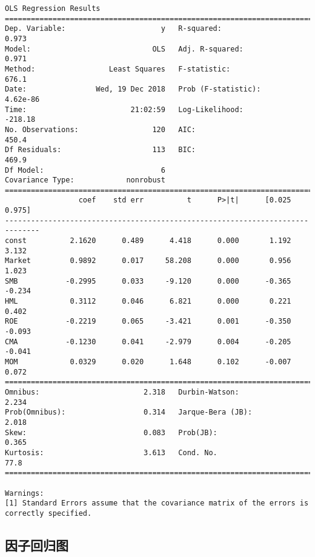 \documentclass[11pt]{article}
\begin{document}
    \begin{Verbatim}[commandchars=\\\{\}]
                            OLS Regression Results                            
==============================================================================
Dep. Variable:                      y   R-squared:                       0.973
Model:                            OLS   Adj. R-squared:                  0.971
Method:                 Least Squares   F-statistic:                     676.1
Date:                Wed, 19 Dec 2018   Prob (F-statistic):           4.62e-86
Time:                        21:02:59   Log-Likelihood:                -218.18
No. Observations:                 120   AIC:                             450.4
Df Residuals:                     113   BIC:                             469.9
Df Model:                           6                                         
Covariance Type:            nonrobust                                         
==============================================================================
                 coef    std err          t      P>|t|      [0.025      0.975]
------------------------------------------------------------------------------
const          2.1620      0.489      4.418      0.000       1.192       3.132
Market         0.9892      0.017     58.208      0.000       0.956       1.023
SMB           -0.2995      0.033     -9.120      0.000      -0.365      -0.234
HML            0.3112      0.046      6.821      0.000       0.221       0.402
ROE           -0.2219      0.065     -3.421      0.001      -0.350      -0.093
CMA           -0.1230      0.041     -2.979      0.004      -0.205      -0.041
MOM            0.0329      0.020      1.648      0.102      -0.007       0.072
==============================================================================
Omnibus:                        2.318   Durbin-Watson:                   2.234
Prob(Omnibus):                  0.314   Jarque-Bera (JB):                2.018
Skew:                           0.083   Prob(JB):                        0.365
Kurtosis:                       3.613   Cond. No.                         77.8
==============================================================================

Warnings:
[1] Standard Errors assume that the covariance matrix of the errors is correctly specified.

    \end{Verbatim}

    \subsection{因子回归图}\label{ux56e0ux5b50ux56deux5f52ux56fe}
\end{document}
